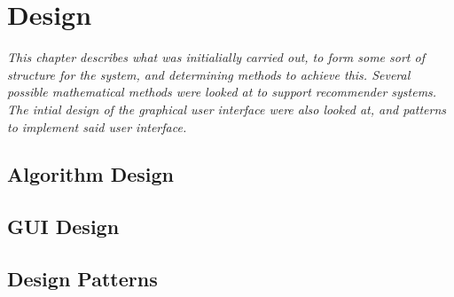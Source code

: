 \chapter{Design}

\textit{This chapter describes what was initialially carried out, to form some sort of structure for the system, and determining methods to achieve this. Several possible mathematical methods were looked at to support recommender systems. The intial design of the graphical user interface were also looked at, and patterns to implement said user interface.}

\section{Algorithm Design}
\label{AlgDes}

\section{GUI Design}
\label{GUIDes}

\section{Design Patterns}
\label{DesPatterns}
